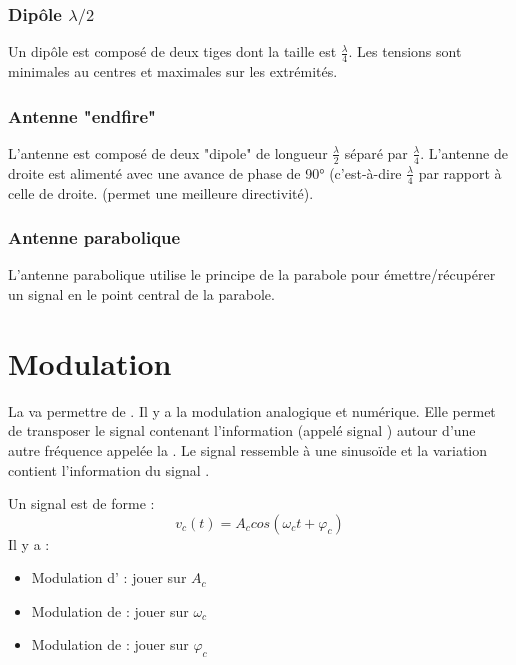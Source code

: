 \subsection[Dipôle]{Dipôle $\lambda/2$}

Un dipôle est composé de deux tiges dont la taille est $\frac{\lambda}{4}$.
Les tensions sont minimales au centres et maximales sur les extrémités.

\subsection{Antenne "endfire"}

L'antenne est composé de deux "dipole" de longueur $\frac{\lambda}{2}$ séparé par $\frac{\lambda}{4}$.  L'antenne de droite est alimenté avec une avance de phase de 90° (c'est-à-dire $\frac{\lambda}{4}$ par rapport à celle de droite.  (permet une meilleure directivité).

\subsection{Antenne parabolique}

L'antenne parabolique utilise le principe de la parabole pour émettre/récupérer
un signal en le point central de la parabole.

\chapter{Modulation}

La  va permettre de . Il y a la modulation analogique et numérique. Elle permet de transposer le signal contenant l'information (appelé signal ) autour d'une autre fréquence appelée la . Le signal  ressemble à une sinusoïde et la variation contient l'information du signal .

Un signal est de forme :
\begin{equation*}
v_c(t) = A_c cos(\omega_c t + \varphi_c)
\end{equation*}
Il y a  :
\begin{itemize}
\item Modulation d' : jouer sur $A_c$
\item Modulation de  : jouer sur $\omega_c$
\item Modulation de  : jouer sur $\varphi_c$
\end{itemize}

